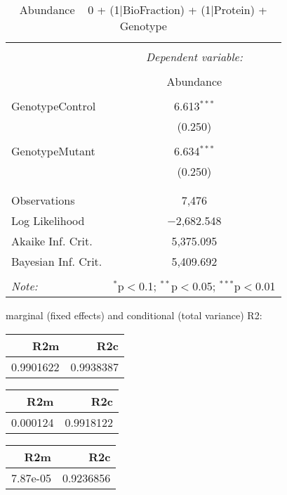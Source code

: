 \documentclass[11pt]{report}
\begin{document}
\begin{table}[!htbp] \centering 
  \caption{Abundance ~ 0 + (1|BioFraction) + (1|Protein) + Genotype} 
  \label{} 
\begin{tabular}{@{\extracolsep{5pt}}lc} 
\\[-1.8ex]\hline 
\hline \\[-1.8ex] 
 & \multicolumn{1}{c}{\textit{Dependent variable:}} \\ 
\cline{2-2} 
\\[-1.8ex] & Abundance \\ 
\hline \\[-1.8ex] 
 GenotypeControl & 6.613$^{***}$ \\ 
  & (0.250) \\ 
  & \\ 
 GenotypeMutant & 6.634$^{***}$ \\ 
  & (0.250) \\ 
  & \\ 
\hline \\[-1.8ex] 
Observations & 7,476 \\ 
Log Likelihood & $-$2,682.548 \\ 
Akaike Inf. Crit. & 5,375.095 \\ 
Bayesian Inf. Crit. & 5,409.692 \\ 
\hline 
\hline \\[-1.8ex] 
\textit{Note:}  & \multicolumn{1}{r}{$^{*}$p$<$0.1; $^{**}$p$<$0.05; $^{***}$p$<$0.01} \\ 
\end{tabular} 
\end{table} 
marginal (fixed effects) and conditional (total variance) R2:

\begin{tabular}{r|r}
\hline
R2m & R2c\\
\hline
0.9901622 & 0.9938387\\
\hline
\end{tabular}

\begin{tabular}{r|r}
\hline
R2m & R2c\\
\hline
0.000124 & 0.9918122\\
\hline
\end{tabular}

\begin{tabular}{r|r}
\hline
R2m & R2c\\
\hline
7.87e-05 & 0.9236856\\
\hline
\end{tabular}
\end{document}
